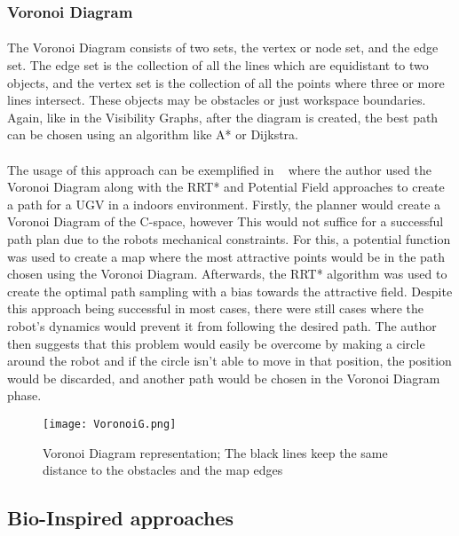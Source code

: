 \subsubsection{Voronoi Diagram}
\label{subsubsec:VD}
\paragraph{}The Voronoi Diagram consists of two sets, the vertex or node set, and the edge set. The edge set is the collection of all the lines 
which are equidistant to two objects, and the vertex set is the collection of all the points where three or more lines intersect. These objects
may be obstacles or just workspace boundaries. Again, like in the Visibility Graphs, after the diagram is created, the best path can be chosen using
an algorithm like A* or Dijkstra.

\paragraph{}The usage of this approach can be exemplified in ~\cite{8948325} where the author used the Voronoi Diagram along with the RRT* and Potential Field
approaches to create a path for a \gls{UGV} in a indoors environment. Firstly, the planner would create a Voronoi Diagram of the C-space, however This
would not suffice for a successful path plan due to the robots mechanical constraints. For this, a potential function was used to create a map
where the most attractive points would be in the path chosen using the Voronoi Diagram. Afterwards, the RRT* algorithm was used to create the
optimal path sampling with a bias towards the attractive field. Despite this approach being successful in most cases, there were still cases where
the robot's dynamics would prevent it from following the desired path. The author then suggests that this problem would easily be overcome by
making a circle around the robot and if the circle isn't able to move in that position, the position would be discarded, and another path would be chosen
in the Voronoi Diagram phase.
\begin{figure}
    \centering
    \texttt{[image: VoronoiG.png]}
    \caption{Voronoi Diagram representation; The black lines keep the same distance to the obstacles and the map edges}
    \label{fig:VoronoiG}
\end{figure}

\subsection{Bio-Inspired approaches}
\label{subsec:BI}
